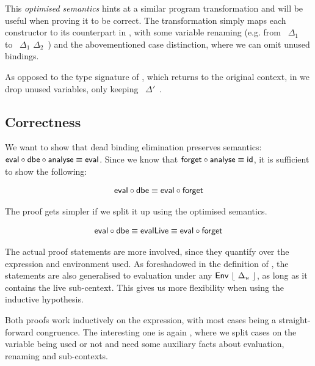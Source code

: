 \documentclass[11pt,a4paper]{article}
\newcommand{\AgdaFloor}[1]{\AgdaFunction{$\lfloor$}\ #1\ \AgdaFunction{$\rfloor$}}
\begin{document}
\CodeLiveEvalLive

This \emph{optimised semantics} hints at a similar program transformation
and will be useful when proving it to be correct.
The transformation simply maps each constructor to its counterpart in ,
with some variable renaming
(e.g. from \AgdaFloor{$\Delta_1$} to \AgdaFloor{$\Delta_1$ \AgdaFunction{$\cup$} $\Delta_2$})
and the abovementioned case distinction,
where we can omit unused bindings.

\CodeLiveDbe
\CodeLiveRestrictedRefSignature

As opposed to the type signature of ,
which returns to the original context,
in  we drop unused variables, only keeping \AgdaFloor{$\Delta'$}.


\subsection{Correctness}

We want to show that dead binding elimination preserves semantics:
$\AgdaFunction{eval} \circ \AgdaFunction{dbe} \circ \AgdaFunction{analyse} \equiv \AgdaFunction{eval}$.
Since we know that $\AgdaFunction{forget} \circ \AgdaFunction{analyse} \equiv \AgdaFunction{id}$,
it is sufficient to show the following:

\begin{align*}
  \AgdaFunction{eval} \circ \AgdaFunction{dbe}
    \equiv \AgdaFunction{eval} \circ \AgdaFunction{forget}
\end{align*}

The proof gets simpler if we split it up using the optimised semantics.

\begin{align*}
  \AgdaFunction{eval} \circ \AgdaFunction{dbe}
    \equiv \AgdaFunction{evalLive}
    \equiv \AgdaFunction{eval} \circ \AgdaFunction{forget}
\end{align*}

The actual proof statements are more involved,
since they quantify over the expression and environment used.
As foreshadowed in the definition of , the statements are also generalised
to evaluation under any $\AgdaDatatype{Env}\ \AgdaFloor{\Delta_u}$,
as long as it contains the live sub-centext.
This gives us more flexibility when using the inductive hypothesis.

\CodeLiveDbeCorrectSignature
\CodeLiveEvalLiveCorrectSignature

Both proofs work inductively on the expression, with most cases being a straight-forward congruence.
The interesting one is again ,
where we split cases on the variable being used or not
and need some auxiliary facts about evaluation, renaming and sub-contexts.
\end{document}
